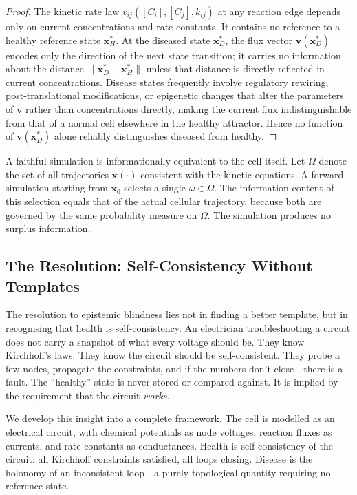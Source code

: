 \documentclass[10pt,twocolumn,a4paper]{article}
\theoremstyle{plain}
\theoremstyle{definition}
\theoremstyle{remark}
\begin{document}
\begin{proof}
The kinetic rate law $v_{ij}([C_i], [C_j], k_{ij})$ at any reaction edge depends only on current concentrations and rate constants. It contains no reference to a healthy reference state $\mathbf{x}^*_H$. At the diseased state $\mathbf{x}^*_D$, the flux vector $\mathbf{v}(\mathbf{x}^*_D)$ encodes only the direction of the next state transition; it carries no information about the distance $\|\mathbf{x}^*_D - \mathbf{x}^*_H\|$ unless that distance is directly reflected in current concentrations. Disease states frequently involve regulatory rewiring, post-translational modifications, or epigenetic changes that alter the parameters of $\mathbf{v}$ rather than concentrations directly, making the current flux indistinguishable from that of a normal cell elsewhere in the healthy attractor. Hence no function of $\mathbf{v}(\mathbf{x}^*_D)$ alone reliably distinguishes diseased from healthy.
\end{proof}

A faithful simulation is informationally equivalent to the cell itself. Let $\Omega$ denote the set of all trajectories $\mathbf{x}(\cdot)$ consistent with the kinetic equations. A forward simulation starting from $\mathbf{x}_0$ selects a single $\omega \in \Omega$. The information content of this selection equals that of the actual cellular trajectory, because both are governed by the same probability measure on $\Omega$. The simulation produces no surplus information.

\subsection{The Resolution: Self-Consistency Without Templates}

The resolution to epistemic blindness lies not in finding a better template, but in recognising that health is self-consistency. An electrician troubleshooting a circuit does not carry a snapshot of what every voltage should be. They know Kirchhoff's laws. They know the circuit should be self-consistent. They probe a few nodes, propagate the constraints, and if the numbers don't close---there is a fault. The ``healthy'' state is never stored or compared against. It is implied by the requirement that the circuit \emph{works}.

We develop this insight into a complete framework. The cell is modelled as an electrical circuit, with chemical potentials as node voltages, reaction fluxes as currents, and rate constants as conductances. Health is self-consistency of the circuit: all Kirchhoff constraints satisfied, all loops closing. Disease is the holonomy of an inconsistent loop---a purely topological quantity requiring no reference state.
\end{document}
